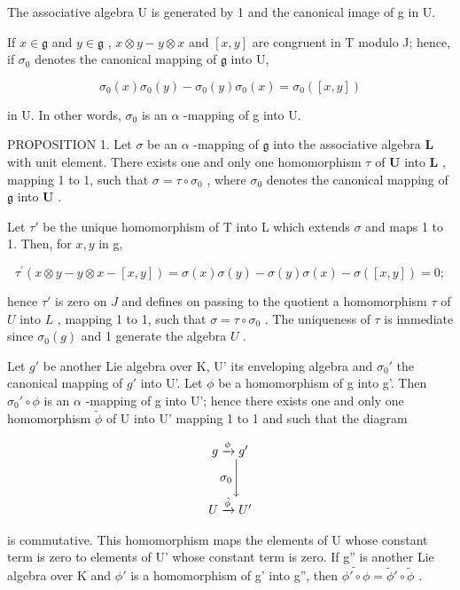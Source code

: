 The associative algebra U is generated by 1 and the canonical image of g in U.

If \(x \in \mathfrak{g}\) and \(y \in \mathfrak{g}\) , \(x \otimes y - y \otimes x\) and \([x, y]\) are congruent in T modulo J; hence, if \(\sigma_0\) denotes the canonical mapping of \(\mathfrak{g}\) into U,

\[
\sigma_ {0} (x) \sigma_ {0} (y) - \sigma_ {0} (y) \sigma_ {0} (x) = \sigma_ {0} ([ x, y ])
\]

in U. In other words, \(\sigma_{0}\) is an \(\alpha\) -mapping of g into U.

PROPOSITION 1. Let \(\sigma\) be an \(\alpha\) -mapping of \(\mathfrak{g}\) into the associative algebra \(\mathbf{L}\) with unit element. There exists one and only one homomorphism \(\tau\) of \(\mathbf{U}\) into \(\mathbf{L}\) , mapping 1 to 1, such that \(\sigma = \tau \circ \sigma_0\) , where \(\sigma_0\) denotes the canonical mapping of \(\mathfrak{g}\) into \(\mathbf{U}\) .

Let \(\tau'\) be the unique homomorphism of T into L which extends \(\sigma\) and maps 1 to 1. Then, for \(x, y\) in g,

\[
\tau^ {\prime} (x \otimes y - y \otimes x - [ x, y ]) = \sigma (x) \sigma (y) - \sigma (y) \sigma (x) - \sigma ([ x, y ]) = 0;
\]

hence \(\tau'\) is zero on \(J\) and defines on passing to the quotient a homomorphism \(\tau\) of \(U\) into \(L\) , mapping 1 to 1, such that \(\sigma = \tau \circ \sigma_0\) . The uniqueness of \(\tau\) is immediate since \(\sigma_0(g)\) and 1 generate the algebra \(U\) .

Let \(g'\) be another Lie algebra over K, U' its enveloping algebra and \(\sigma_0'\) the canonical mapping of \(g'\) into U'. Let \(\phi\) be a homomorphism of g into g'. Then \(\sigma_0' \circ \phi\) is an \(\alpha\) -mapping of g into U'; hence there exists one and only one homomorphism \(\tilde{\phi}\) of U into U' mapping 1 to 1 and such that the diagram

\[
\begin{array}{c} g \xrightarrow {\phi} g ^ {\prime} \\ \sigma_ {0} \Biggl \downarrow \\ U \xrightarrow {\tilde {\phi}} U ^ {\prime} \end{array}
\]

is commutative. This homomorphism maps the elements of U whose constant term is zero to elements of U' whose constant term is zero. If g'' is another Lie algebra over K and \(\phi'\) is a homomorphism of g' into g'', then \(\widetilde{\phi'\circ\phi}=\widetilde{\phi}'\circ\widetilde{\phi}\) .


